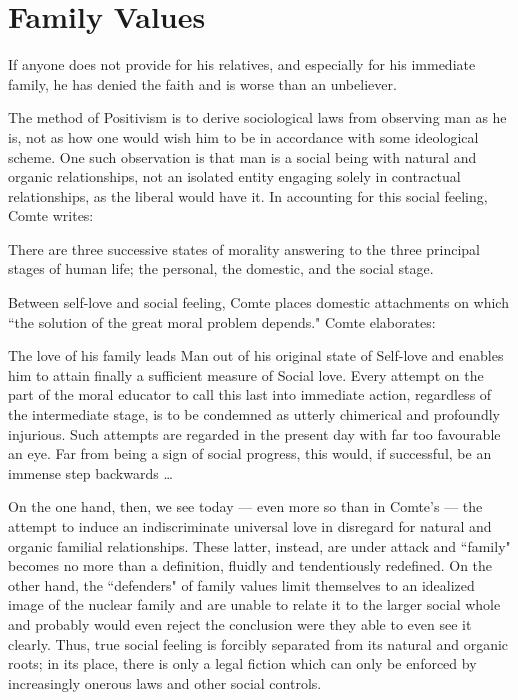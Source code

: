 \section{Family Values}

\begin{quotex}
If anyone does not provide for his relatives, and especially for his immediate family, he has denied the faith and is worse than an unbeliever. 

\end{quotex}
The method of Positivism is to derive sociological laws from observing man as he is, not as how one would wish him to be in accordance with some ideological scheme. One such observation is that man is a social being with natural and organic relationships, not an isolated entity engaging solely in contractual relationships, as the liberal would have it. In accounting for this social feeling, Comte writes:

\begin{quotex}
There are three successive states of morality answering to the three principal stages of human life; the personal, the domestic, and the social stage. 

\end{quotex}
Between self-love and social feeling, Comte places domestic attachments on which ``the solution of the great moral problem depends." Comte elaborates:

\begin{quotex}
The love of his family leads Man out of his original state of Self-love and enables him to attain finally a sufficient measure of Social love. Every attempt on the part of the moral educator to call this last into immediate action, regardless of the intermediate stage, is to be condemned as utterly chimerical and profoundly injurious. Such attempts are regarded in the present day with far too favourable an eye. Far from being a sign of social progress, this would, if successful, be an immense step backwards … 

\end{quotex}
On the one hand, then, we see today — even more so than in Comte's — the attempt to induce an indiscriminate universal love in disregard for natural and organic familial relationships. These latter, instead, are under attack and ``family" becomes no more than a definition, fluidly and tendentiously redefined. On the other hand, the ``defenders" of family values limit themselves to an idealized image of the nuclear family and are unable to relate it to the larger social whole and probably would even reject the conclusion were they able to even see it clearly. Thus, true social feeling is forcibly separated from its natural and organic roots; in its place, there is only a legal fiction which can only be enforced by increasingly onerous laws and other social controls.

